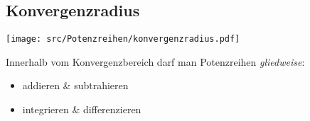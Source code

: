 \subsection{Konvergenzradius}
    \vspace{0.5em}
    \begin{center}
            \texttt{[image: src/Potenzreihen/konvergenzradius.pdf]}
    \end{center}
    Innerhalb vom Konvergenzbereich darf man Potenzreihen \textit{gliedweise}:
    \begin{itemize}
        \item addieren \& subtrahieren
        \item integrieren \& differenzieren
    \end{itemize}